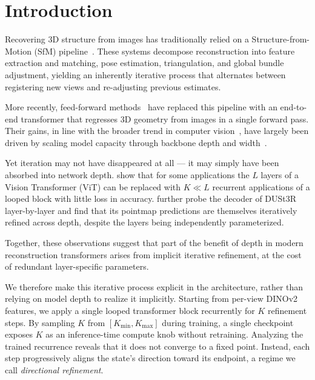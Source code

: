 
\section{Introduction}
\label{sec:intro}








Recovering 3D structure from images has traditionally relied on a Structure-from-Motion (SfM) pipeline~\citep{schoenberger2016sfm,pan2024global}. These systems decompose reconstruction into feature extraction and matching, pose estimation, triangulation, and global bundle adjustment, yielding an inherently iterative process that alternates between registering new views and re-adjusting previous estimates.

More recently, feed-forward methods~\citep{dust3r,leroy2025grounding,vggt,lin2025depth,wang2025pi,keetha2026mapanything,vggt_omega} have replaced this pipeline with an end-to-end transformer that regresses 3D geometry from images in a single forward pass.
Their gains, in line with the broader trend in computer vision~\citep{dosovitskiy2021image,zhai2022scaling,radford2021clip,oquab2023dinov2,kirillov2023sam}, have largely been driven by scaling model capacity through backbone depth and width~\citep{lin2025depth}.

Yet iteration may not have disappeared at all --- it may simply have been absorbed into network depth.
\citet{jacobs2025raptor} show that for some applications the $L$ layers of a Vision Transformer (ViT) can be replaced with $K \ll L$ recurrent applications of a looped block with little loss in accuracy.
\citet{stary2025understanding} further probe the decoder of DUSt3R~\citep{dust3r} layer-by-layer and find that its pointmap predictions are themselves iteratively refined across depth, despite the layers being independently parameterized.

Together, these observations suggest that part of the benefit of depth in modern reconstruction transformers arises from implicit iterative refinement, at the cost of redundant layer-specific parameters.



We therefore make this iterative process explicit in the architecture, rather than relying on model depth to realize it implicitly. Starting from per-view DINOv2~\citep{oquab2023dinov2} features, we apply a single looped transformer block recurrently for $K$ refinement steps. By sampling $K$ from $[K_\text{min}, K_\text{max}]$ during training, a single checkpoint exposes $K$ as an inference-time compute knob without retraining. Analyzing the trained recurrence reveals that it does not converge to a fixed point. Instead, each step progressively aligns the state's direction toward its endpoint, a regime we call \emph{directional refinement}.



